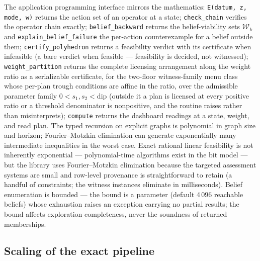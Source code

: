 \documentclass[11pt]{article}
\begin{document}
The application programming interface mirrors the mathematics:
\texttt{E(datum, z, mode, w)} returns the action set of an operator at a
state; \texttt{check\_chain} verifies the operator chain exactly;
\texttt{belief\_backward} returns the belief-viability sets
$\mathcal{W}_k$ and \texttt{explain\_belief\_failure} the per-action
counterexample for a belief outside them; \texttt{certify\_polyhedron}
returns a feasibility verdict with its certificate when infeasible (a
bare verdict when feasible --- feasibility is decided, not witnessed);
\texttt{weight\_partition} returns the complete licensing arrangement along
the weight ratio as a serializable certificate, for the two-floor
witness-family menu class whose per-plan trough conditions are affine in
the ratio, over the admissible parameter family $0 < s_1, s_2 <
\mathrm{dip}$ (outside it a plan is licensed at every positive ratio or
a threshold denominator is nonpositive, and the routine raises rather
than misinterprets);
\texttt{compute} returns the dashboard readings at a
state, weight, and read plan. The typed recursion on explicit graphs is
polynomial in graph size and horizon; Fourier--Motzkin elimination can
generate exponentially many intermediate inequalities in the worst case.
Exact rational linear feasibility is not inherently exponential ---
polynomial-time algorithms exist in the bit model --- but the library
uses Fourier--Motzkin elimination because the targeted assessment systems
are small and row-level provenance is straightforward to retain (a
handful of constraints; the witness instances eliminate in milliseconds). Belief enumeration is bounded --- the bound is a parameter
(default 4\,096 reachable beliefs) whose exhaustion raises an exception
carrying no partial results; the bound affects exploration completeness,
never the soundness of returned memberships.

\subsection{Scaling of the exact pipeline}\label{sec:scaling}
\end{document}
